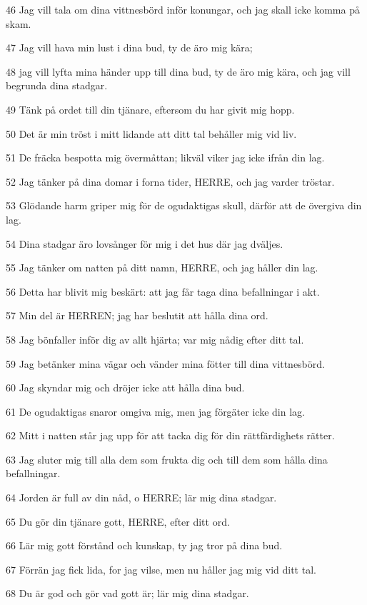 \par 46 Jag vill tala om dina vittnesbörd inför konungar, och jag skall icke komma på skam.
\par 47 Jag vill hava min lust i dina bud, ty de äro mig kära;
\par 48 jag vill lyfta mina händer upp till dina bud, ty de äro mig kära, och jag vill begrunda dina stadgar.
\par 49 Tänk på ordet till din tjänare, eftersom du har givit mig hopp.
\par 50 Det är min tröst i mitt lidande att ditt tal behåller mig vid liv.
\par 51 De fräcka bespotta mig övermåttan; likväl viker jag icke ifrån din lag.
\par 52 Jag tänker på dina domar i forna tider, HERRE, och jag varder tröstar.
\par 53 Glödande harm griper mig för de ogudaktigas skull, därför att de övergiva din lag.
\par 54 Dina stadgar äro lovsånger för mig i det hus där jag dväljes.
\par 55 Jag tänker om natten på ditt namn, HERRE, och jag håller din lag.
\par 56 Detta har blivit mig beskärt: att jag får taga dina befallningar i akt.
\par 57 Min del är HERREN; jag har beslutit att hålla dina ord.
\par 58 Jag bönfaller inför dig av allt hjärta; var mig nådig efter ditt tal.
\par 59 Jag betänker mina vägar och vänder mina fötter till dina vittnesbörd.
\par 60 Jag skyndar mig och dröjer icke att hålla dina bud.
\par 61 De ogudaktigas snaror omgiva mig, men jag förgäter icke din lag.
\par 62 Mitt i natten står jag upp för att tacka dig för din rättfärdighets rätter.
\par 63 Jag sluter mig till alla dem som frukta dig och till dem som hålla dina befallningar.
\par 64 Jorden är full av din nåd, o HERRE; lär mig dina stadgar.
\par 65 Du gör din tjänare gott, HERRE, efter ditt ord.
\par 66 Lär mig gott förstånd och kunskap, ty jag tror på dina bud.
\par 67 Förrän jag fick lida, for jag vilse, men nu håller jag mig vid ditt tal.
\par 68 Du är god och gör vad gott är; lär mig dina stadgar.
